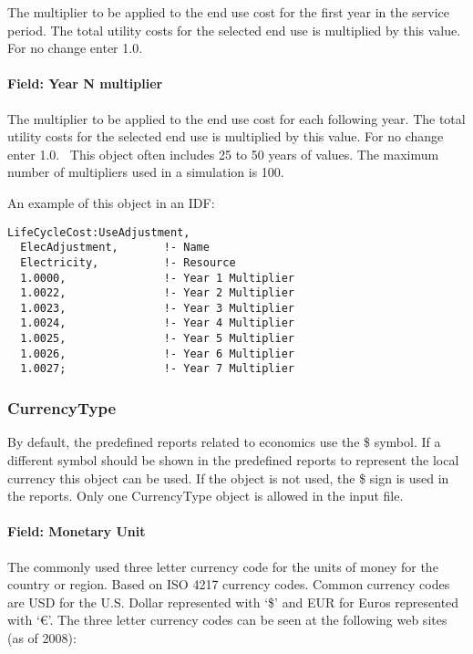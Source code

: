The multiplier to be applied to the end use cost for the first year in the service period. The total utility costs for the selected end use is multiplied by this value. For no change enter 1.0.

\paragraph{Field: Year N multiplier}\label{field-year-n-multiplier}

The multiplier to be applied to the end use cost for each following year. The total utility costs for the selected end use is multiplied by this value. For no change enter 1.0.~ This object often includes 25 to 50 years of values. The maximum number of multipliers used in a simulation is 100.

An example of this object in an IDF:

\begin{lstlisting}
LifeCycleCost:UseAdjustment,
  ElecAdjustment,       !- Name
  Electricity,          !- Resource
  1.0000,               !- Year 1 Multiplier
  1.0022,               !- Year 2 Multiplier
  1.0023,               !- Year 3 Multiplier
  1.0024,               !- Year 4 Multiplier
  1.0025,               !- Year 5 Multiplier
  1.0026,               !- Year 6 Multiplier
  1.0027;               !- Year 7 Multiplier
\end{lstlisting}

\subsubsection{CurrencyType}\label{currencytype}

By default, the predefined reports related to economics use the \$ symbol. If a different symbol should be shown in the predefined reports to represent the local currency this object can be used. If the object is not used, the \$ sign is used in the reports. Only one CurrencyType object is allowed in the input file.

\paragraph{Field: Monetary Unit}\label{field-monetary-unit}

The commonly used three letter currency code for the units of money for the country or region. Based on ISO 4217 currency codes. Common currency codes are USD for the U.S. Dollar represented with `\$' and EUR for Euros represented with `€'. The three letter currency codes can be seen at the following web sites (as of 2008):


